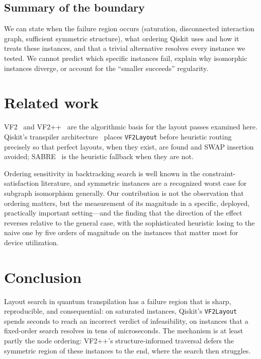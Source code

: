 \documentclass[11pt]{article}
\begin{document}
\subsection{Summary of the boundary}

We can state when the failure region occurs (saturation, disconnected
interaction graph, sufficient symmetric structure), what ordering
Qiskit uses and how it treats these instances, and that a trivial
alternative resolves every instance we tested. We cannot predict which
specific instances fail, explain why isomorphic instances diverge, or
account for the ``smaller succeeds'' regularity.

\section{Related work}

VF2~\cite{vf2} and VF2++~\cite{vf2pp} are the algorithmic basis for the
layout passes examined here. Qiskit's transpiler
architecture~\cite{qiskit} places \texttt{VF2Layout} before heuristic
routing precisely so that perfect layouts, when they exist, are found
and SWAP insertion avoided; SABRE~\cite{sabre} is the heuristic
fallback when they are not.

Ordering sensitivity in backtracking search is well known in the
constraint-satisfaction literature, and symmetric instances are a
recognized worst case for subgraph isomorphism generally. Our
contribution is not the observation that ordering matters, but the
measurement of its magnitude in a specific, deployed, practically
important setting---and the finding that the direction of the effect
reverses relative to the general case, with the sophisticated heuristic
losing to the naive one by five orders of magnitude on the instances
that matter most for device utilization.

\section{Conclusion}

Layout search in quantum transpilation has a failure region that is
sharp, reproducible, and consequential: on saturated instances, Qiskit's
\texttt{VF2Layout} spends seconds to reach an incorrect verdict of
infeasibility, on instances that a fixed-order search resolves in tens
of microseconds. The mechanism is at least partly the node ordering:
VF2++'s structure-informed traversal defers the symmetric region of
these instances to the end, where the search then struggles.
\end{document}
